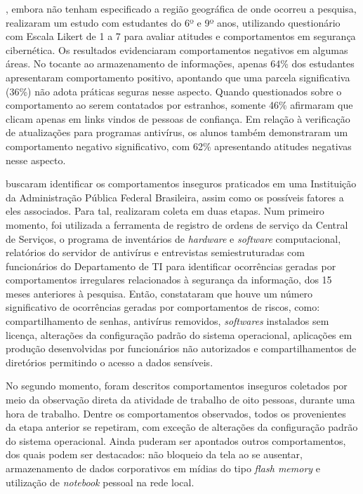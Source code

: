 \documentclass[portuguese]{textolivre}
\begin{document}
\textcite{antunes_integrated_2021}, embora não tenham especificado a região geográfica de onde ocorreu a pesquisa, realizaram um estudo com estudantes do 6º e 9º anos, utilizando questionário com Escala Likert de 1 a 7 para avaliar atitudes e comportamentos em segurança cibernética. Os resultados evidenciaram comportamentos negativos em algumas áreas. No tocante ao armazenamento de informações, apenas 64\% dos estudantes apresentaram comportamento positivo, apontando que uma parcela significativa (36\%) não adota práticas seguras nesse aspecto. Quando questionados sobre o comportamento ao serem contatados por estranhos, somente 46\% afirmaram que clicam apenas em links vindos de pessoas de confiança. Em relação à verificação de atualizações para programas antivírus, os alunos também demonstraram um comportamento negativo significativo, com 62\% apresentando atitudes negativas nesse aspecto.

\textcite{santos_gestao_2021} buscaram identificar os comportamentos inseguros praticados em uma Instituição da Administração Pública Federal Brasileira, assim como os possíveis fatores a eles associados. Para tal, realizaram coleta em duas etapas. Num primeiro momento, foi utilizada a ferramenta de registro de ordens de serviço da Central de Serviços, o programa de inventários de \textit{hardware} e \textit{software} computacional, relatórios do servidor de antivírus e entrevistas semiestruturadas com funcionários do Departamento de TI para identificar ocorrências geradas por comportamentos irregulares relacionados à segurança da informação, dos 15 meses anteriores à pesquisa. Então, constataram que houve um número significativo de ocorrências geradas por comportamentos de riscos, como: compartilhamento de senhas, antivírus removidos, \textit{softwares} instalados sem licença, alterações da configuração padrão do sistema operacional, aplicações em produção desenvolvidas por funcionários não autorizados e compartilhamentos de diretórios permitindo o acesso a dados sensíveis.

No segundo momento, foram descritos comportamentos inseguros coletados por meio da observação direta da atividade de trabalho de oito pessoas, durante uma hora de trabalho. Dentre os comportamentos observados, todos os provenientes da etapa anterior se repetiram, com exceção de alterações da configuração padrão do sistema operacional. Ainda puderam ser apontados outros comportamentos, dos quais podem ser destacados: não bloqueio da tela ao se ausentar, armazenamento de dados corporativos em mídias do tipo \textit{flash memory} e utilização de \textit{notebook} pessoal na rede local.
\end{document}
